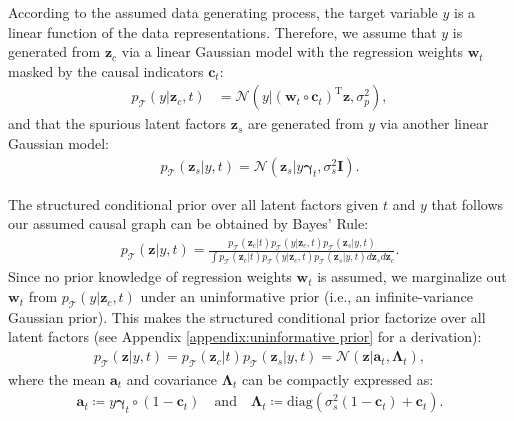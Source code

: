\documentclass{article} %
\theoremstyle{plain}
\theoremstyle{definition}
\theoremstyle{remark}
\begin{document}
According to the assumed data generating process, the target variable $y$ is a linear function of the data representations. Therefore, we assume that $y$ is generated from $\mathbf{z}_c$ via a linear Gaussian model with the regression weights $\mathbf{w}_t$ masked by the causal indicators $\mathbf{c}_t$:
\begin{align}
    p_{\mathcal{T}}(y|\mathbf{z}_c,t) & =\mathcal{N}(y|(\mathbf{w}_t\circ\mathbf{c}_t)^{\text{T}}\mathbf{z},\sigma_{p}^{2}),
\end{align}
and that the spurious latent factors $\mathbf{z}_s$ are generated from $y$ via another linear Gaussian model:
\begin{align}
    p_{\mathcal{T}}(\mathbf{z}_s|y,t)=\mathcal{N}(\mathbf{z}_s|y\boldsymbol{\gamma}_t,\sigma_s^2\mathbf{I}).
\end{align}

The structured conditional prior over all latent factors given $t$ and $y$ that follows our assumed causal graph can be obtained by Bayes' Rule:
\begin{align}
    p_{\mathcal{T}}(\mathbf{z}|y,t)=\frac{p_{\mathcal{T}}(\mathbf{z}_c|t)p_{\mathcal{T}}(y|\mathbf{z}_c,t)p_{\mathcal{T}}(\mathbf{z}_s|y,t)}{\int p_{\mathcal{T}}(\mathbf{z}_c|t)p_{\mathcal{T}}(y|\mathbf{z}_c,t)p_{\mathcal{T}}(\mathbf{z}_s|y,t)d\mathbf{z}_s d\mathbf{z}_c}.
\end{align}
Since no prior knowledge of regression weights $\mathbf{w}_t$ is assumed, we marginalize out $\mathbf{w}_t$ from $p_{\mathcal{T}}(y|\mathbf{z}_c,t)$ under an uninformative prior (i.e., an infinite-variance Gaussian prior). This makes the structured conditional prior factorize over all latent factors (see Appendix \ref{appendix:uninformative prior} for a derivation):
\begin{align}\label{eq:lin-causal-prior}
        p_{\mathcal{T}}(\mathbf{z}|y,t)
        =p_{\mathcal{T}}(\mathbf{z}_c|t)p_{\mathcal{T}}(\mathbf{z}_s|y,t)
        =\mathcal{N}(\mathbf{z}|\mathbf{a}_t,\boldsymbol{\Lambda}_t),
\end{align}
where the mean $\mathbf{a}_t$ and covariance $\boldsymbol{\Lambda}_t$ can be compactly expressed as:
\begin{align}
    \mathbf{a}_t\coloneqq y\boldsymbol{\gamma}_t\circ(1-\mathbf{c}_t)
    \quad\text{and}\quad
    \boldsymbol{\Lambda}_t\coloneqq \text{diag}(\sigma_{s}^{2}(1-\mathbf{c}_t)+\mathbf{c}_t).
\end{align}

\vspace{-0.75ex}
\end{document}
